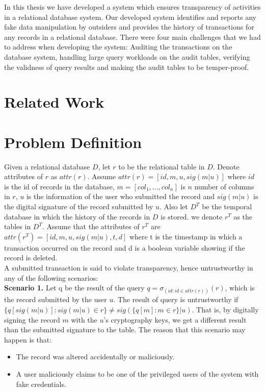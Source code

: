 In this thesis we have developed a system which ensures transparency of activities in a relational database system. Our developed system identifies and reports any fake data manipulation by outsiders and provides the history of transactions for any records in a relational database. There were four main challenges that we had to address when developing the system: Auditing the transactions on the database system, handling large query workloads on the audit tables, verifying the validness of query results and making the audit tables to be temper-proof. 
\section{Related Work}
\section{Problem Definition}
Given a relational database $D$, let $r$ to be the relational table in $D$. Denote attributes of $r$ as $attr(r)$. Assume $attr(r)= [id,m,u, sig(m|u)]$ where $id$ is the id of records in the database, $m = [col_1,...,col_n]$ is $n$ number of columns in $r$, $u$ is the information of the user who submitted the record and $sig(m|u)$ is the digital signature of the record submitted by $u$. Also let $D^T$ be the temporal database in which the history of the records in $D$ is stored. we denote $r^T$ as the tables in $D^T$. Assume that the attributes of $r^T$ are $attr(r^T) = [id,m,u,sig(m|u),t,d]$ where t is the timestamp in which a transaction occurred on the record and d is a boolean variable showing if the record is deleted.\\
A submitted transaction is said to violate transparency, hence untrustworthy in any of the following scenarios:\\
\textbf{Scenario 1.} Let q be the result of the query $q=\sigma_{(id : id \in attr(r))}(r)$, which is the record submitted by the user $u$. The result of query is untrustworthy if $\{q[sig(m|u)]: sig(m|u) \in r\} \neq sig(\{q[m]: m \in r \} |u)$. That is, by digitally signing the record $m$ with the $u$'s cryptography keys, we get a different result than the submitted signature to the table. The reason that this scenario may happen is that: 
\begin{itemize}
	\item  The record was altered accidentally or maliciously.
	\item  A user maliciously claims to be one of the privileged users of the system with fake credentials.
\end{itemize} 
